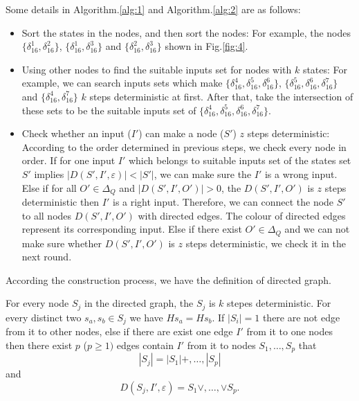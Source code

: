 Some details in Algorithm.\ref{alg:1} and Algorithm.\ref{alg:2} are as follows:
\begin{itemize}
 \item Sort the states in the nodes, and then sort the nodes: For example, the nodes $\{\delta_{16}^1,\delta_{16}^2\}$, $\{\delta_{16}^1,\delta_{16}^3\}$ and $\{\delta_{16}^2,\delta_{16}^3\}$ shown in Fig.\ref{fig:4}. 
  \item Using other nodes to find the suitable inputs set for nodes with $k$ states: For example, we can search inputs sets which make $\{\delta_{16}^4,\delta_{16}^5,\delta_{16}^6\}$, $\{\delta_{16}^5,\delta_{16}^6,\delta_{16}^7\}$ and $\{\delta_{16}^4,\delta_{16}^7\}$ $k$ steps deterministic at first. After that, take the intersection of these sets to be the suitable inputs set of $\{\delta_{16}^4,\delta_{16}^5,\delta_{16}^6,\delta_{16}^7\}$. 
  \item Check whether an input ($I'$) can make a node ($S'$) $z$ steps deterministic: According to the order determined in previous steps, we check every node in order. If for one input $I'$ which belongs to suitable inputs set of the states set $S'$ implies $|D\left(S',I',\varepsilon\right)|<|S'|$, we can make sure the $I'$ is a wrong input. Else if for all $O' \in \Delta_Q$ and $|D\left(S',I',O'\right)|>0$, the $D\left(S',I',O'\right)$ is $z$ steps deterministic then $I'$ is a right input. Therefore, we can connect the node $S'$ to all nodes $D\left(S',I',O'\right)$ with directed edges. The colour of directed edges represent its corresponding input. Else if there exist $O' \in \Delta_Q$ and we can not make sure whether $D\left(S',I',O'\right)$ is $z$ steps deterministic, we check it in the next round. 
\end{itemize} 

According the construction process, we have the definition of directed graph.
\begin{definition}
For every node $S_j$ in the directed graph, the $S_j$ is $k$ stepes deterministic. For every distinct two $s_a, s_b \in S_j$ we have $Hs_a=Hs_b$. If $|S_i|=1$ there are not edge from it to other nodes, else if there are exist one edge $I'$ from it to one nodes then there exist $p$ ($p\ge 1)$ edges contain $I'$ from it to nodes $S_1,\ldots,S_p$ that \[|S_j|= |S_1|+,\ldots,|S_p|\] and \[D\left(S_j,I',\varepsilon\right)=S_1\vee,\ldots,\vee S_p.\]
\end{definition}


